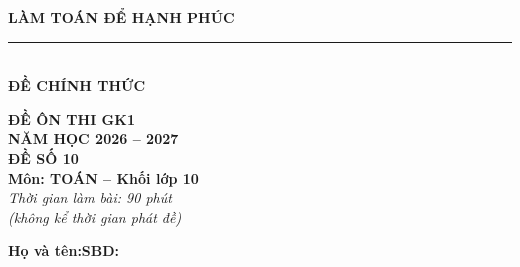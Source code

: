 \documentclass[12pt,a4paper]{article}
\begin{document}
\noindent
\begin{minipage}[c]{0.38\textwidth}
    \centering
    \textbf{LÀM TOÁN ĐỂ HẠNH PHÚC}\\[-2pt]
    \rule{3.2cm}{0.6pt}\\[4pt]
    \textbf{ĐỀ CHÍNH THỨC}
\end{minipage}\hfill
\begin{minipage}[c]{0.35\textwidth}
    \centering
    \textbf{ĐỀ ÔN THI GK1}\\
    \textbf{NĂM HỌC 2026 -- 2027}\\[2pt]
    \textbf{ĐỀ SỐ 10}\\
    \textbf{Môn: TOÁN -- Khối lớp 10}\\
    \textit{\small Thời gian làm bài: 90 phút\\(không kể thời gian phát đề)}
\end{minipage}

\vspace{0.2cm}
\noindent
\begin{minipage}[b]{0.78\textwidth}
    \textbf{Họ và tên:}\dotfill\textbf{SBD:}\makebox[3.5cm]{\dotfill}
\end{minipage}\hfill
\begin{minipage}[b]{0.20\textwidth}
    \hfill
    \setlength{\fboxrule}{0.8pt}%
\end{minipage}
\vspace{0.2cm}
\end{document}
